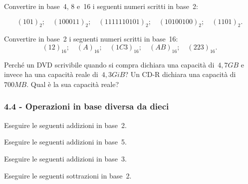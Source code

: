 
\begin{esercizio}
\label{ese:4.18}
Convertire in base~4, 8 e~16 i seguenti numeri scritti in base~2:

\[(101)_{2};\quad(100011)_{2};\quad (1111110101)_{2};\quad (10100100)_{2};\quad (1101)_{2}.\]
\end{esercizio}


\begin{esercizio}
\label{ese:4.19}
Convertire in base~2 i seguenti numeri scritti in base~16:
\[(12)_{16};\quad (A)_{16};\quad (1C3)_{16};\quad (AB)_{16};\quad (223)_{16}.\]
\end{esercizio}


\begin{esercizio}[*]
 \label{ese:4.20}
Perché un DVD scrivibile quando si compra dichiara una capacità di~$4,7\unit{GB}$ e
invece ha una capacità reale di~$4,3\unit{GiB}$? Un CD-R dichiara una
capacità di~$700\unit{MB}$. Qual è la sua capacità reale?
\end{esercizio}

\subsubsection*{4.4 - Operazioni in base diversa da dieci}

\begin{esercizio}
\label{ese:4.21}
Eseguire le seguenti addizioni in base~2.

 
\end{esercizio}

\begin{esercizio}
\label{ese:4.22}
Eseguire le seguenti addizioni in base~5.

 
\end{esercizio}


\begin{esercizio}
\label{ese:4.23}
Eseguire le seguenti addizioni in base~3.

 
\end{esercizio}

\begin{esercizio}
 \label{ese:4.24}
 Eseguire le seguenti sottrazioni in base~2.

 
\end{esercizio}

